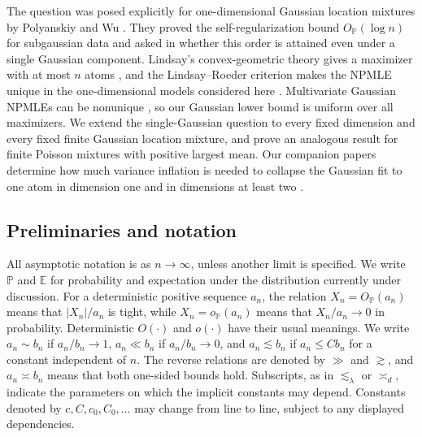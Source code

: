 \documentclass[11pt]{article}
\theoremstyle{definition}
\numberwithin{equation}{section}
\begin{document}
The question was posed explicitly for one-dimensional Gaussian location
mixtures by Polyanskiy and Wu \cite{polyanskiy2020self}. They proved the
self-regularization bound \(O_{\mathbb P}(\log n)\) for subgaussian data and
asked in \cite[Section~5.6]{polyanskiy2020self} whether this order is attained
even under a single Gaussian component. Lindsay's convex-geometric theory
gives a maximizer with at most \(n\) atoms \cite{lindsay1983geometryA}, and
the Lindsay--Roeder criterion makes the NPMLE unique in the one-dimensional
models considered here \cite{lindsay1993uniqueness}. Multivariate Gaussian
NPMLEs can be nonunique \cite{soloff2024multivariate}, so our Gaussian lower
bound is uniform over all maximizers. We extend the single-Gaussian question
to every fixed dimension and every fixed finite Gaussian location mixture,
and prove an analogous result for finite Poisson mixtures with positive
largest mean. Our companion papers determine how much variance inflation is
needed to collapse the Gaussian fit to one atom in dimension one and in
dimensions at least two
\cite{varianceD1Companion,varianceMultivariateCompanion}.

\subsection*{Preliminaries and notation}

All asymptotic notation is as $n\to\infty$, unless another limit is
specified. We write $\mathbb P$ and $\mathbb E$ for probability and
expectation under the distribution currently under discussion. For a
deterministic positive sequence $a_n$, the relation
$X_n=O_{\mathbb P}(a_n)$ means that $|X_n|/a_n$ is tight, while
$X_n=o_{\mathbb P}(a_n)$ means that $X_n/a_n\to0$ in probability.
Deterministic $O(\cdot)$ and $o(\cdot)$ have their usual meanings. We write
$a_n\sim b_n$ if $a_n/b_n\to1$, $a_n\ll b_n$ if $a_n/b_n\to0$, and
$a_n\lesssim b_n$ if $a_n\le Cb_n$ for a constant independent of $n$.
The reverse relations are denoted by $\gg$ and $\gtrsim$, and
$a_n\asymp b_n$ means that both one-sided bounds hold. Subscripts, as in
$\lesssim_\lambda$ or $\asymp_d$, indicate the parameters on which the
implicit constants may depend. Constants denoted by
$c,C,c_0,C_0,\dots$ may change from line to line, subject to any displayed
dependencies.
\end{document}
